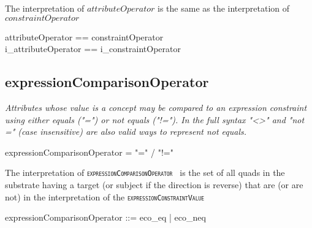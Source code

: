 \documentclass{article}
\def\spec#1{{\tt \small \textsc{{#1}} }}
\def\bnf#1{{\scriptsize {{#1}} }}
\def\desc#1{{\small \textsl{{#1}} }}
\begin{document}
The interpretation of $attributeOperator$ is the same as the interpretation of $constraintOperator$

\begin{zed}
attributeOperator == constraintOperator \\
i\_attributeOperator == i\_constraintOperator
\end{zed}

\subsection{expressionComparisonOperator}
\begin{framed}
\desc{Attributes whose value is a concept may be compared to an expression constraint using either equals ("=") or not equals ("!="). In the full syntax "<>" and "not =" (case insensitive) are also  valid ways to represent not equals.}
\end{framed}

\begin{framed}
\noindent
\bnf{expressionComparisonOperator = "=" / "!="}
\end{framed}

The interpretation of \spec{expressionComparisonOperator} is the set of all quads in the substrate having a target (or subject if the direction is reverse) that are (or are not) in
the interpretation of the \spec{expressionConstraintValue}


\begin{zed}
expressionComparisonOperator ::= eco\_eq | eco\_neq
\end{zed}
\end{document}
